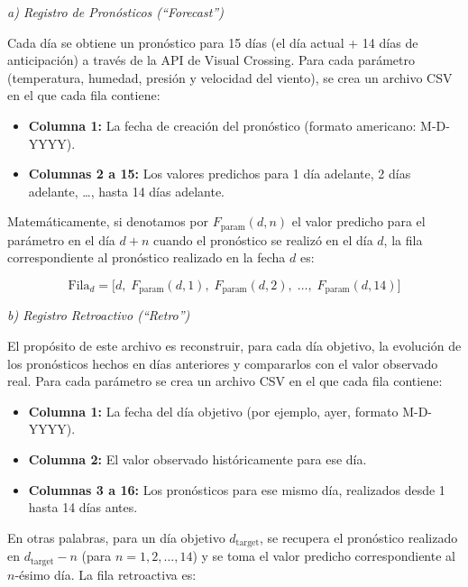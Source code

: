 \documentclass[
  10pt,
  a4paper,
  DIV=11,
  numbers=noendperiod,
  open=any]{scrreprt}
\providecommand{\tightlist}{%
  \setlength{\itemsep}{0pt}\setlength{\parskip}{0pt}}
\numberwithin{equation}{chapter}
\numberwithin{equation}{section}
\renewcommand{\[}{\begin{equation}}
\renewcommand{\]}{\end{equation}}
\begin{document}
\emph{a) Registro de Pronósticos (``Forecast'')}

Cada día se obtiene un pronóstico para 15 días (el día actual + 14 días
de anticipación) a través de la API de Visual Crossing. Para cada
parámetro (temperatura, humedad, presión y velocidad del viento), se
crea un archivo CSV en el que cada fila contiene:

\begin{itemize}
\tightlist
\item
  \textbf{Columna 1:} La fecha de creación del pronóstico (formato
  americano: M-D-YYYY).
\item
  \textbf{Columnas 2 a 15:} Los valores predichos para 1 día adelante, 2
  días adelante, \ldots, hasta 14 días adelante.
\end{itemize}

Matemáticamente, si denotamos por \(F_{\text{param}}(d, n)\) el valor
predicho para el parámetro en el día \(d+n\) cuando el pronóstico se
realizó en el día \(d\), la fila correspondiente al pronóstico realizado
en la fecha \(d\) es:

\begin{equation}
\text{Fila}_d = \bigl[ d,\; F_{\text{param}}(d,1),\; F_{\text{param}}(d,2),\; \dots,\; F_{\text{param}}(d,14) \bigr]
\end{equation}

\emph{b) Registro Retroactivo (``Retro'')}

El propósito de este archivo es reconstruir, para cada día objetivo, la
evolución de los pronósticos hechos en días anteriores y compararlos con
el valor observado real. Para cada parámetro se crea un archivo CSV en
el que cada fila contiene:

\begin{itemize}
\tightlist
\item
  \textbf{Columna 1:} La fecha del día objetivo (por ejemplo, ayer,
  formato M-D-YYYY).
\item
  \textbf{Columna 2:} El valor observado históricamente para ese día.
\item
  \textbf{Columnas 3 a 16:} Los pronósticos para ese mismo día,
  realizados desde 1 hasta 14 días antes.
\end{itemize}

En otras palabras, para un día objetivo \(d_{\text{target}}\), se
recupera el pronóstico realizado en \(d_{\text{target}} - n\) (para
\(n = 1,2,\dots,14\)) y se toma el valor predicho correspondiente al
\(n\)-ésimo día. La fila retroactiva es:
\end{document}
